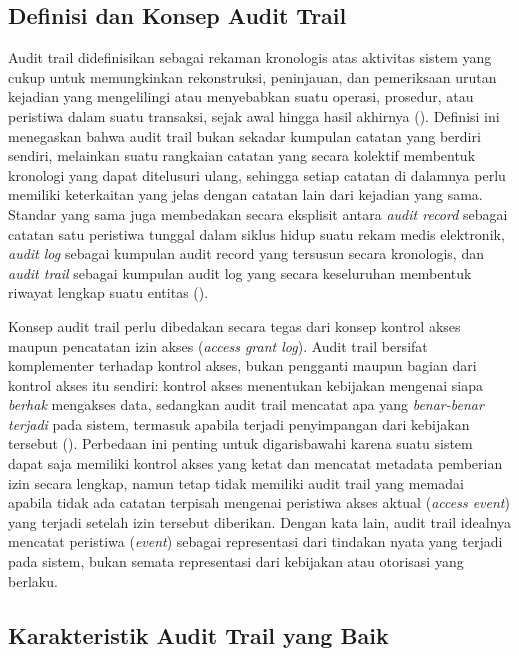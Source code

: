 \subsection{Definisi dan Konsep Audit Trail}
\label{subsec:definisi-audit-trail}

Audit trail didefinisikan sebagai rekaman kronologis atas aktivitas sistem yang cukup untuk memungkinkan rekonstruksi, peninjauan, dan pemeriksaan urutan kejadian yang mengelilingi atau menyebabkan suatu operasi, prosedur, atau peristiwa dalam suatu transaksi, sejak awal hingga hasil akhirnya (\cite{iso27789_2021}). Definisi ini menegaskan bahwa audit trail bukan sekadar kumpulan catatan yang berdiri sendiri, melainkan suatu rangkaian catatan yang secara kolektif membentuk kronologi yang dapat ditelusuri ulang, sehingga setiap catatan di dalamnya perlu memiliki keterkaitan yang jelas dengan catatan lain dari kejadian yang sama. Standar yang sama juga membedakan secara eksplisit antara \textit{audit record} sebagai catatan satu peristiwa tunggal dalam siklus hidup suatu rekam medis elektronik, \textit{audit log} sebagai kumpulan audit record yang tersusun secara kronologis, dan \textit{audit trail} sebagai kumpulan audit log yang secara keseluruhan membentuk riwayat lengkap suatu entitas (\cite{iso27789_2021}).

Konsep audit trail perlu dibedakan secara tegas dari konsep kontrol akses maupun pencatatan izin akses (\textit{access grant log}). Audit trail bersifat komplementer terhadap kontrol akses, bukan pengganti maupun bagian dari kontrol akses itu sendiri: kontrol akses menentukan kebijakan mengenai siapa \textit{berhak} mengakses data, sedangkan audit trail mencatat apa yang \textit{benar-benar terjadi} pada sistem, termasuk apabila terjadi penyimpangan dari kebijakan tersebut (\cite{iso27789_2021}). Perbedaan ini penting untuk digarisbawahi karena suatu sistem dapat saja memiliki kontrol akses yang ketat dan mencatat metadata pemberian izin secara lengkap, namun tetap tidak memiliki audit trail yang memadai apabila tidak ada catatan terpisah mengenai peristiwa akses aktual (\textit{access event}) yang terjadi setelah izin tersebut diberikan. Dengan kata lain, audit trail idealnya mencatat peristiwa (\textit{event}) sebagai representasi dari tindakan nyata yang terjadi pada sistem, bukan semata representasi dari kebijakan atau otorisasi yang berlaku.

\subsection{Karakteristik Audit Trail yang Baik}
\label{subsec:karakteristik-audit-trail}

